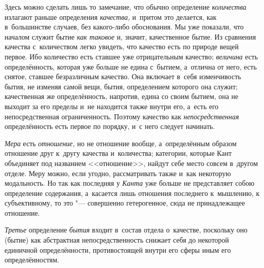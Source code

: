 Здесь можно сделать лишь то замечание, что обычно определение {\em количества}
излагают раньше определения {\em качества,} и~притом это делается, как
в~большинстве случаев, без какого-либо обоснования. Мы уже показали, что
началом служит бытие {\em как таковое} и, значит, качественное бытие. Из
сравнения качества с~количеством легко увидеть, что качество есть по природе
вещей первое. Ибо количество есть ставшее уже отрицательным качество;
{\em величина} есть определённость, которая уже больше не едина с~бытием,
а~отлична от него, есть снятое, ставшее безразличным качество. Она включает
в~себя изменчивость бытия, не изменяя самой вещи, бытия, определением которого
она служит; качественная же определённость, напротив, едина со своим бытием,
она не выходит за его пределы и~не находится также внутри его, а~есть его
непосредственная ограниченность. Поэтому качество как {\em непосредственная}
определённость есть первое по порядку, и~с него следует начинать.

{\em Мера} есть {\em отношение,} но не отношение вообще, а~определённым образом
отношение друг к~другу качества и~количества; категории, которые Кант
объединяет под названием <<отношение>>, найдут себе место совсем в~другом
отделе. Меру можно, если угодно, рассматривать также и~как некоторую
модальность. Но так как последняя у {\em Канта} уже больше не представляет
собою определение содержания, а~касается лишь отношения последнего к~мышлению,
к субъективному, то это "--- совершенно гетерогенное, сюда не принадлежащее
отношение.

{\em Третье} определение {\em бытия} входит в~состав отдела о~качестве,
поскольку оно (бытие) как абстрактная непосредственность снижает себя до
некоторой единичной определённости, противостоящей внутри его сферы иным
его определённостям.

\bigskip
